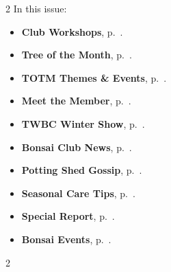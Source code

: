 \setlength{\columnsep}{-5.0cm}
\begin{multicols}{2}
    \noindent\textsf{In this issue:}
    \begin{itemize}
        \item \textsf{\textbf{Club Workshops}}, p.~\pageref{2026-01-workshop-mep}.
        \item \textsf{\textbf{Tree of the Month}}, p.~\pageref{2026-01-totm}.
        \item \textsf{\textbf{TOTM Themes \& Events}}, p.~\pageref{2026-01-themes}.
        \item \textsf{\textbf{Meet the Member}}, p.~\pageref{2026-01-roots}.
        \item \textsf{\textbf{TWBC Winter Show}}, p.~\pageref{2026-01-show}.
        \item \textsf{\textbf{Bonsai Club News}}, p.~\pageref{2026-01-news}.
        \item \textsf{\textbf{Potting Shed Gossip}}, p.~\pageref{2026-01-gossip}.
        \item \textsf{\textbf{Seasonal Care Tips}}, p.~\pageref{2026-01-care}.
        \item \textsf{\textbf{Special Report}}, p.~\pageref{2026-01-hardman-report}.
        \item \textsf{\textbf{Bonsai Events}}, p.~\pageref{2026-01-events}.
    \end{itemize}
    \vfill\null
    \columnbreak

    
\end{multicols}
\pagebreak

\setlength{\columnsep}{0.5cm}
\begin{multicols}{2}
    
    
    
%    
%    
    
    
    
    
    
%    
%    
    
\end{multicols}
